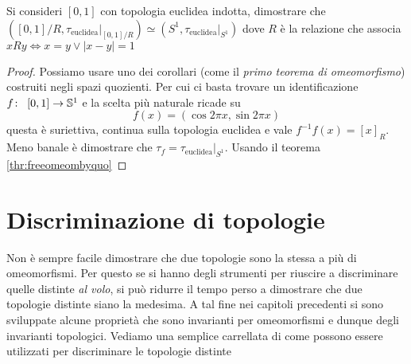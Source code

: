 \begin{theorem}
	Si consideri $\left[0,1\right]$ con topologia euclidea indotta, dimostrare che $(\left[0,1\right]/R, \tau_{\text{euclidea}}|_{\left[0,1\right]/R}) \simeq (S^1, \tau_{\text{euclidea}}|_{S^1})$ dove $R$ è la relazione che associa $xRy \Leftrightarrow x = y \lor |x - y| = 1$
\end{theorem}
\begin{proof}
	Possiamo usare uno dei corollari (come il \textit{primo teorema di omeomorfismo}) costruiti negli spazi quozienti. Per cui ci basta trovare un identificazione $f \colon\ \left[0,1\right] \rightarrow \mathbb{S}^1$ e la scelta più naturale ricade su 
	\begin{equation*}
		f(x) = (\cos 2\pi x, \sin 2 \pi x)
	\end{equation*}
	questa è suriettiva, continua sulla topologia euclidea e vale $f^{-1}f(x) = \left[x\right]_R$. Meno banale è dimostrare che $\tau_f = \tau_{\text{euclidea}}|_{S^1}$. Usando il teorema \ref{thr:freeomeombyquo}
\end{proof}

\section{Discriminazione di topologie}

Non è sempre facile dimostrare che due topologie sono la stessa a più di omeomorfismi. Per questo se si hanno degli strumenti per riuscire a discriminare quelle distinte \textit{al volo}, si può ridurre il tempo perso a dimostrare che due topologie distinte siano la medesima. A tal fine nei capitoli precedenti si sono sviluppate alcune proprietà che sono invarianti per omeomorfismi e dunque degli invarianti topologici. Vediamo una semplice carrellata di come possono essere utilizzati per discriminare le topologie distinte

